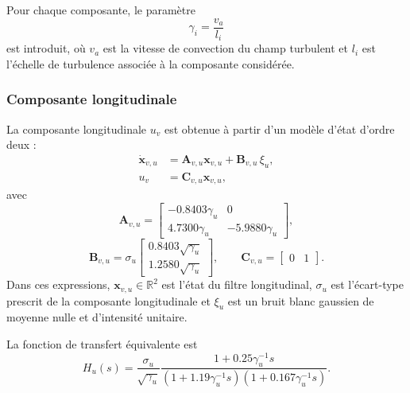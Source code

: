 \documentclass[11pt,a4paper,oneside]{report}
\newcommand{\vect}[1]{\bm{#1}}
\begin{document}
Pour chaque composante, le paramètre
\begin{equation}
	\gamma_i=\frac{v_a}{l_i}
	\label{eq_vk_gamma}
\end{equation}
est introduit, où $v_a$ est la vitesse de convection du champ turbulent et $l_i$ est l'échelle de turbulence associée à la composante considérée.

\subsubsection{Composante longitudinale}

La composante longitudinale $u_v$ est obtenue à partir d'un modèle d'état d'ordre deux :
\begin{subequations}
	\label{eq_vk_longitudinal_state_space}
	\begin{align}
		\dot{\vect x}_{v,u}
		&=
		\mathbf A_{v,u}\vect x_{v,u}
		+
		\mathbf B_{v,u}\,\xi_u,
		\\
		u_v
		&=
		\mathbf C_{v,u}\vect x_{v,u},
	\end{align}
\end{subequations}
avec
\begin{equation}
	\mathbf A_{v,u}
	=
	\begin{bmatrix}
		-0.8403\gamma_u & 0\\
		4.7300\gamma_u & -5.9880\gamma_u
	\end{bmatrix},
	\label{eq_vk_longitudinal_state_matrix}
\end{equation}
\begin{equation}
	\mathbf B_{v,u}
	=
	\sigma_u
	\begin{bmatrix}
		0.8403\sqrt{\gamma_u}\\
		1.2580\sqrt{\gamma_u}
	\end{bmatrix},
	\qquad
	\mathbf C_{v,u}
	=
	\begin{bmatrix}
		0 & 1
	\end{bmatrix}.
	\label{eq_vk_longitudinal_input_output_matrices}
\end{equation}
Dans ces expressions, $\vect x_{v,u}\in\mathbb{R}^2$ est l'état du filtre longitudinal, $\sigma_u$ est l'écart-type prescrit de la composante longitudinale et $\xi_u$ est un bruit blanc gaussien de moyenne nulle et d'intensité unitaire.

La fonction de transfert équivalente est
\begin{equation}
	H_u(s)
	=
	\frac{\sigma_u}{\sqrt{\gamma_u}}
	\frac{1+0.25\gamma_u^{-1}s}
	{\left(1+1.19\gamma_u^{-1}s\right)
		\left(1+0.167\gamma_u^{-1}s\right)}.
	\label{eq_vk_longitudinal_transfer_function}
\end{equation}
\end{document}
